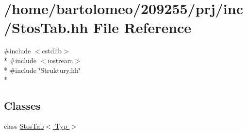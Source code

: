 \hypertarget{_stos_tab_8hh}{\section{/home/bartolomeo/209255/prj/inc/\-Stos\-Tab.hh File Reference}
\label{_stos_tab_8hh}
}
{\ttfamily \#include $<$cstdlib$>$}\\*
{\ttfamily \#include $<$iostream$>$}\\*
{\ttfamily \#include \char`\"{}Struktury.\-hh\char`\"{}}\\*
\subsection*{Classes}
\begin{DoxyCompactItemize}
\item 
class \hyperlink{class_stos_tab}{Stos\-Tab$<$ Typ $>$}
\end{DoxyCompactItemize}
